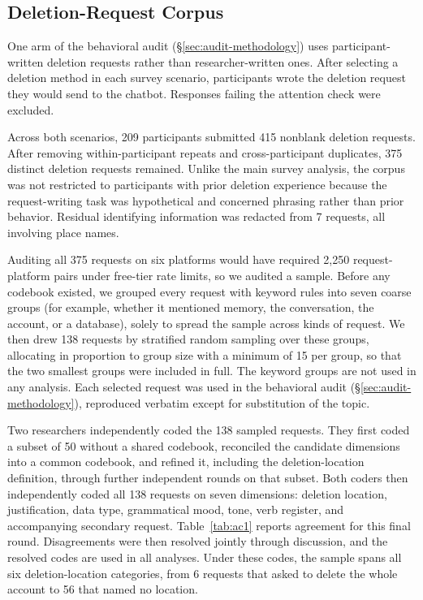 \documentclass[conference,compsoc]{IEEEtran}
\begin{document}
\subsection{Deletion-Request Corpus}
\label{sec:prompt-corpus}

One arm of the behavioral audit (\S\ref{sec:audit-methodology}) uses participant-written deletion requests rather than researcher-written ones. After selecting a deletion method in each survey scenario, participants wrote the deletion request they would send to the chatbot. Responses failing the attention check were excluded.

Across both scenarios, 209 participants submitted 415 nonblank deletion requests. After removing within-participant repeats and cross-participant duplicates, 375 distinct deletion requests remained. Unlike the main survey analysis, the corpus was not restricted to participants with prior deletion experience because the request-writing task was hypothetical and concerned phrasing rather than prior behavior. Residual identifying information was redacted from 7 requests, all involving place names.

Auditing all 375 requests on six platforms would have required 2,250 request-platform pairs under free-tier rate limits, so we audited a sample. Before any codebook existed, we grouped every request with keyword rules into seven coarse groups (for example, whether it mentioned memory, the conversation, the account, or a database), solely to spread the sample across kinds of request. We then drew 138 requests by stratified random sampling over these groups, allocating in proportion to group size with a minimum of 15 per group, so that the two smallest groups were included in full. The keyword groups are not used in any analysis. Each selected request was used in the behavioral audit (\S\ref{sec:audit-methodology}), reproduced verbatim except for substitution of the topic.

Two researchers independently coded the 138 sampled requests. They first coded a subset of 50 without a shared codebook, reconciled the candidate dimensions into a common codebook, and refined it, including the deletion-location definition, through further independent rounds on that subset. Both coders then independently coded all 138 requests on seven dimensions: deletion location, justification, data type, grammatical mood, tone, verb register, and accompanying secondary request. Table~\ref{tab:ac1} reports agreement for this final round. Disagreements were then resolved jointly through discussion, and the resolved codes are used in all analyses. Under these codes, the sample spans all six deletion-location categories, from 6 requests that asked to delete the whole account to 56 that named no location.
\end{document}
